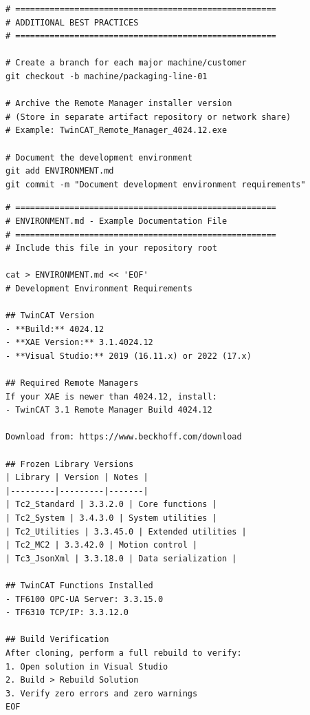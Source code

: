 \documentclass[11pt,a4paper]{article}
\begin{document}
\begin{lstlisting}[style=bashstyle]
# =====================================================
# ADDITIONAL BEST PRACTICES
# =====================================================

# Create a branch for each major machine/customer
git checkout -b machine/packaging-line-01

# Archive the Remote Manager installer version
# (Store in separate artifact repository or network share)
# Example: TwinCAT_Remote_Manager_4024.12.exe

# Document the development environment
git add ENVIRONMENT.md
git commit -m "Document development environment requirements"
\end{lstlisting}

\begin{lstlisting}[style=bashstyle]
# =====================================================
# ENVIRONMENT.md - Example Documentation File
# =====================================================
# Include this file in your repository root

cat > ENVIRONMENT.md << 'EOF'
# Development Environment Requirements

## TwinCAT Version
- **Build:** 4024.12
- **XAE Version:** 3.1.4024.12
- **Visual Studio:** 2019 (16.11.x) or 2022 (17.x)

## Required Remote Managers
If your XAE is newer than 4024.12, install:
- TwinCAT 3.1 Remote Manager Build 4024.12

Download from: https://www.beckhoff.com/download

## Frozen Library Versions
| Library | Version | Notes |
|---------|---------|-------|
| Tc2_Standard | 3.3.2.0 | Core functions |
| Tc2_System | 3.4.3.0 | System utilities |
| Tc2_Utilities | 3.3.45.0 | Extended utilities |
| Tc2_MC2 | 3.3.42.0 | Motion control |
| Tc3_JsonXml | 3.3.18.0 | Data serialization |

## TwinCAT Functions Installed
- TF6100 OPC-UA Server: 3.3.15.0
- TF6310 TCP/IP: 3.3.12.0

## Build Verification
After cloning, perform a full rebuild to verify:
1. Open solution in Visual Studio
2. Build > Rebuild Solution
3. Verify zero errors and zero warnings
EOF
\end{lstlisting}
\end{document}

